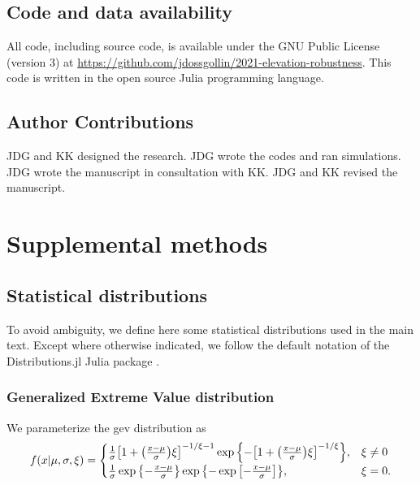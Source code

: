 \documentclass[11pt]{article}
\begin{document}
\subsection*{Code and data availability}

All code, including source code, is available under the GNU Public License (version 3) at \url{https://github.com/jdossgollin/2021-elevation-robustness}.
This code is written in the open source Julia programming language.

\subsection*{Author Contributions}

JDG and KK designed the research.
JDG wrote the codes and ran simulations.
JDG wrote the manuscript in consultation with KK.
JDG and KK revised the manuscript.

\printbibliography

\appendix
\newcommand{\hbAppendixPrefix}{S}
\renewcommand{\thefigure}{\hbAppendixPrefix\arabic{figure}}
\setcounter{figure}{0}
\renewcommand{\thetable}{\hbAppendixPrefix\arabic{table}}
\setcounter{table}{0}
\renewcommand{\theequation}{\hbAppendixPrefix\arabic{equation}}
\setcounter{equation}{0}

\newpage

\printglossary[type=\acronymtype,title=List of Abbreviations]

\section{Supplemental methods}

\subsection{Statistical distributions}

To avoid ambiguity, we define here some statistical distributions used in the main text.
Except where otherwise indicated, we follow the default notation of the Distributions.jl Julia package \citep{besancon_distributions.jl:2021}.

\subsubsection{Generalized Extreme Value distribution}
We parameterize the \gls{gev} distribution as
\begin{equation}\label{eq:gev-dist}
    f(x | \mu, \sigma, \xi)= \begin{cases}
        \frac{1}{\sigma} \qty[ 1 + \qty( \frac{x-\mu}{\sigma} ) \xi ]^{-1 / \xi - 1} \exp \qty{- \qty[1+\qty(\frac{x-\mu}{\sigma}) \xi ]^{-1 / \xi} }, & \xi \neq 0 \\
        \frac{1}{\sigma} \exp \qty{-\frac{x-\mu}{\sigma}} \exp \qty{ -\exp \qty[-\frac{x-\mu}{\sigma}]},                                               & \xi=0.
    \end{cases}
\end{equation}
\end{document}
